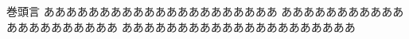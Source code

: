 \documentclass[uplatex,dvipdfmx]{vkaishi}
\begin{document}
\author[中須]{かすみ}
\date{\today}

\begin{preface}{巻頭言}
  あああああああああああああああああああああ
  あああああああああああああああああああああ
  あああああああああああああああああああああ
\end{preface}


\end{document}
